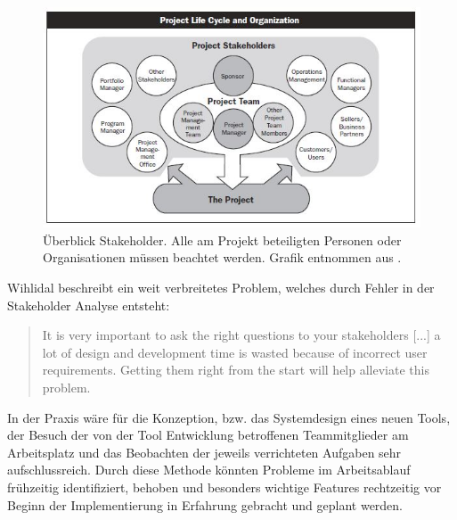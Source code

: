 \documentclass[pagesize, paper=a4, fontsize=12pt, titlepage=true, headings=small, headnosepline, abstractoff, liststotoc, nochapterprefix, plainheadsepline, twoside]{scrreprt}
\begin{document}
\begin{figure}[ht]
	\centering
	\includegraphics[width=\linewidth]{Bilder/Stakeholder_Uebersicht.jpg}
	\caption{Überblick Stakeholder. Alle am Projekt beteiligten Personen oder Organisationen müssen beachtet werden. Grafik entnommen aus .}
	\label{StakeholderÜbersicht}
\end{figure}

Wihlidal beschreibt ein weit verbreitetes Problem, welches durch Fehler in der Stakeholder Analyse entsteht:
\begin{quote}
\glqq It is very important to ask the right questions to your stakeholders [...] a lot of design and development time is wasted because of incorrect user requirements. Getting them right from the start will help alleviate this problem.\grqq{}
\autocite[S. 28]{Wihlidal2006}
\end{quote}

In der Praxis wäre für die Konzeption, bzw. das Systemdesign eines neuen Tools, der Besuch der von der Tool Entwicklung betroffenen Teammitglieder am Arbeitsplatz und das Beobachten der jeweils verrichteten Aufgaben sehr aufschlussreich. Durch diese Methode könnten Probleme im Arbeitsablauf frühzeitig identifiziert, behoben und besonders wichtige Features rechtzeitig vor Beginn der Implementierung in Erfahrung gebracht und geplant werden.
\end{document}

